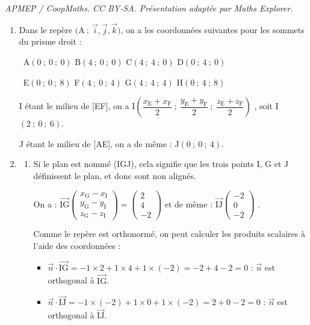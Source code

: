 \documentclass[10pt]{article}
\providecommand{\vect}[1]{\overrightarrow{#1}}
\begin{document}
\noindent\textit{APMEP / CoopMaths. CC BY-SA. Présentation adaptée par Maths Explorer.}\par\medskip
\begin{enumerate}
\item Dans le repère $\big(\mathrm{A}~;~\vect{i},\vect{j},\vect{k}\big)$, on a les coordonnées suivantes pour les sommets du prisme droit :

	\hfill~A$(0~;~0~;~0)$ \hfill B$ (4~;~0~;~0) $ \hfill C$(4~;~4~;~0)$ \hfill D$(0~;~4~;~0)$\hfill~

	\hfill~E$(0~;~0~;~8)$ \hfill F$ (4~;~0~;~4) $ \hfill G$(4~;~4~;~4)$ \hfill H$(0~;~4~;~8)$\hfill~

	I étant le milieu de [EF], on a I$\left(\dfrac{x_\mathrm{E}+x_\mathrm{F}}{2}~;~\dfrac{y_\mathrm{E}+y_\mathrm{F}}{2}~;~\dfrac{z_\mathrm{E}+z_\mathrm{F}}{2}\right)$
	, soit I$(2~;~0~;~6)$.

	J étant le milieu de [AE], on a de même : J$(0~;~0~;~4)$.

\item 
	\begin{enumerate}
		\item Si le plan est nommé (IGJ), cela signifie que les trois points I, G et J définissent le plan, et donc sont non alignés.

		On a : $\vect{\mathrm{IG}}\begin{pmatrix} x_\mathrm{G}-x_\mathrm{I}\\y_\mathrm{G}-y_\mathrm{I}\\z_\mathrm{G}-z_\mathrm{I} \end{pmatrix} = \begin{pmatrix} 2\\4\\-2\end{pmatrix}$ \quad et de même : $\vect{\mathrm{IJ}} \begin{pmatrix} -2\\0\\-2\end{pmatrix}$ .

		Comme le repère est orthonormé, on peut calculer les produits scalaires à l'aide des coordonnées :

\begin{itemize}
\item $ \vect{n}\cdot \vect{\mathrm{IG}} = -1\times 2 + 1 \times 4 + 1 \times (-2) = -2 + 4-2 = 0$ : $\vect{n}$ est orthogonal à $ \vect{\mathrm{IG}} $.
\item $ \vect{n}\cdot \vect{\mathrm{IJ}} = -1\times (-2) + 1 \times 0 + 1\times (-2) = 2 + 0-2 = 0$ : $\vect{n}$ est orthogonal à $ \vect{\mathrm{IJ}} $.
\end{itemize}


\end{enumerate}
\end{enumerate}
\end{document}
